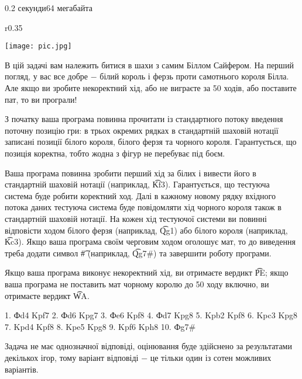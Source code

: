\begin{problem}{}{}{}{0.2 секунди}{64 мегабайта}

\begin{wrapfigure}{r}{0.35\textwidth}
\vspace{-20pt}
  \begin{center}
    \texttt{[image: pic.jpg]}
  \end{center}
  \vspace{-20pt}
  \vspace{1pt}
\end{wrapfigure}

В цій задачі вам належить битися в шахи з самим Біллом Сайфером.
На перший погляд, у вас все добре $-$ білий король і ферзь проти самотнього короля Білла.
Але якщо ви зробите некоректний хід, або не виграєте за 50 ходів, або поставите пат, то ви програли!




\InputFile
З початку ваша програма повинна прочитати із стандартного потоку введення поточну позицію гри:
в трьох окремих рядках в стандартній шаховій нотації записані позиції білого короля, білого ферзя та чорного короля.
Гарантується, що позиція коректна, тобто жодна з фігур не перебуває під боєм.

\OutputFile
Ваша програма повинна зробити перший хід за білих і вивести його в стандартній шаховій нотації (наприклад, {\t{Kf3}}).
Гарантується, що тестуюча система буде робити коректний ход.
Далі в кажному новому рядку вхідного потока даних тестуюча система буде повідомляти хід чорного короля також в стандартній шаховій нотації. На кожен хід тестуючої  системи ви повинні  відповісти ходом білого ферзя (наприклад, {\t{Qg1}})
або білого короля (наприклад, {\t{Kc3}}). Якщо ваша програма своїм черговим ходом оголошує мат, то до виведення треба додати символ {\t{\#}}
(наприклад, {\t{Qg7\#}}) та завершити роботу програми.

Якщо ваша програма виконує некоректний хід, ви отримаєте вердикт {\t{PE}}; якщо ваша програма 
не поставить мат чорному королю до 50 ходу включно, ви отримаєте вердикт {\t{WA}}.

1. Фd4 Kpf7 2. Фd6 Kpg7 3. Фe6 Kpf8 4. Фd7 Kpg8 5. Kpb2 Kpf8 6. Kpc3 Kpg8 7. Kpd4 Kpf8 8. Kpe5 Kpg8 9. Kpf6 Kph8 10. Фg7#
\fi

\Example
\begin{example}
%
\end{example}

\Note
Задача не має однозначної відповіді,  оцінювання буде здійснено за результатами декількох ігор,
тому варіант відповіді  $-$ це тільки один із сотен можливих  варіантів.

\end{problem}

